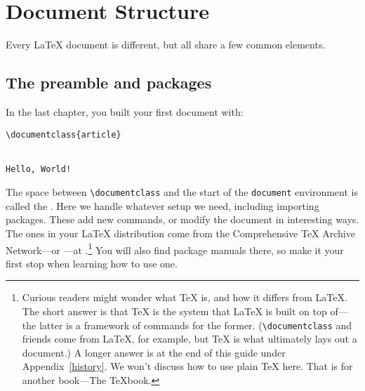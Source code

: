\chapter{Document Structure}
\label{structure}

Every \LaTeX{} document is different,
but all share a few common elements.

\section{The preamble and packages}
In the last chapter, you built your first document with:
\begin{leftfigure}
\begin{lstlisting}
\documentclass{article}


Hello, World!

\end{lstlisting}
\end{leftfigure}
The space between \verb|\documentclass| and the start of the
\texttt{document} environment is called the .
Here we handle whatever setup we need, including importing packages.
These add new commands, or modify the document in interesting ways.
The ones in your \LaTeX{} distribution come from the Comprehensive \TeX{}
Archive Network---or ---at .\punckern\footnote{%
Curious readers might wonder what \TeX{} is, and how it differs from \LaTeX.
The short answer is that \TeX{} is the system that \LaTeX{}
is built on top of---the latter is a framework of commands for the former.
(\texttt{\textbackslash documentclass} and friends come from
\LaTeX{}, for example, but \TeX{} is what ultimately lays out a document.)
A longer answer is at the end of this guide under Appendix~\ref{history}.
We won't discuss how to use plain \TeX{} here. That is for another book---The
\TeX book.}
You will also find package manuals there,
so make it your first stop when learning how to use one.

